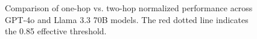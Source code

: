 \begin{figure}[h!]
    \centering
    \caption{Comparison of one-hop vs. two-hop normalized performance across GPT-4o and Llama 3.3 70B models. The red dotted line indicates the 0.85 effective threshold.}
    \label{fig:one_vs_twohop}
\end{figure}